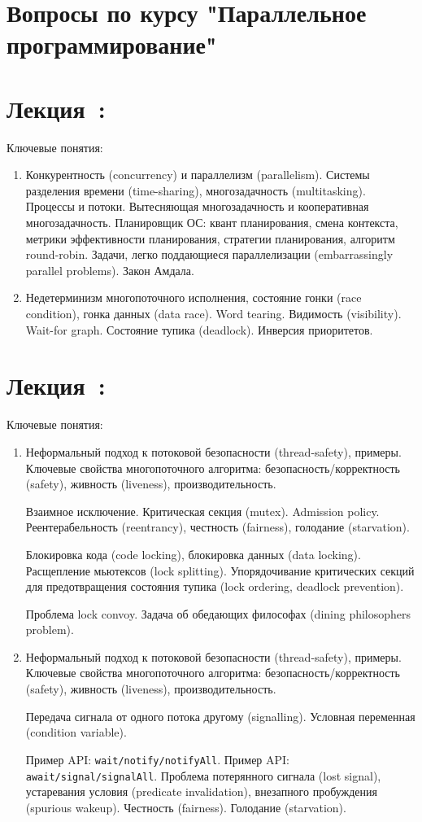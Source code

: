 \documentclass[a4paper, 12pt]{extarticle}
\title{}
\author{}
\date{}
\newcommand{\threadSafetySimple}{Неформальный подход к потоковой безопасности (thread-safety), примеры. Ключевые свойства многопоточного алгоритма: безопасность/корректность (safety), живность (liveness), производительность.}
\newcommand{\mutexBasics}{Взаимное исключение. Критическая секция (mutex). Admission policy. Реентерабельность (reentrancy), честность (fairness), голодание (starvation).}
\newcommand{\condVarBasics}{Передача сигнала от одного потока другому (signalling). Условная переменная (condition variable).}
\newcommand{\mutexDesign}{Блокировка кода (code locking), блокировка данных (data locking). Расщепление мьютексов (lock splitting). Упорядочивание критических секций для предотвращения состояния тупика (lock ordering, deadlock prevention).}
\begin{document}
\section*{Вопросы по курсу "Параллельное программирование"}

\section{Лекция~\introNum: \introTopic}

Ключевые понятия: \introKey

\begin{enumerate}[\thesection .1]
	
	\item Конкурентность (concurrency) и параллелизм (parallelism). Системы разделения времени (time-sharing), многозадачность (multitasking). Процессы и потоки. Вытесняющая многозадачность и кооперативная многозадачность. Планировщик ОС: квант планирования, смена контекста, метрики эффективности планирования, стратегии планирования, алгоритм round-robin. Задачи, легко поддающиеся параллелизации (embarrassingly parallel problems). Закон Амдала.

	\item Недетерминизм многопоточного исполнения, состояние гонки (race condition), гонка данных (data race). Word tearing. Видимость (visibility). Wait-for graph. Состояние тупика (deadlock). Инверсия приоритетов.
\end{enumerate}

\section{Лекция~\basicNum: \basicTopic}

Ключевые понятия: \basicKey

\begin{enumerate}[\thesection .1]
	
	\item \threadSafetySimple 

	\mutexBasics 

	\mutexDesign	
	
	Проблема lock convoy. Задача об обедающих философах (dining philosophers problem).

	\item \threadSafetySimple 

	\condVarBasics


	Пример API: \texttt{wait/notify/notifyAll}. Пример API: \texttt{await/signal/signalAll}.
	Проблема потерянного сигнала (lost signal), устаревания условия (predicate invalidation), внезапного пробуждения (spurious wakeup). Честность (fairness). Голодание (starvation).

\end{enumerate}
\end{document}
